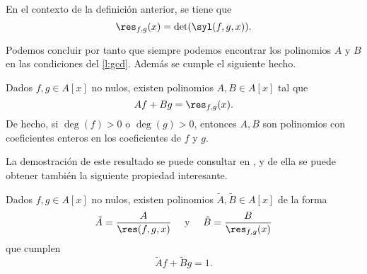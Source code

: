 \begin{proposicion}
    En el contexto de la definición anterior, se tiene que 
    \begin{equation*}
        \res_{f,g}(x) = \det(\syl(f,g,x)).
    \end{equation*}
\end{proposicion}
Podemos concluir por tanto que siempre podemos encontrar los polinomios $A$ y $B$ en las condiciones del \autoref{l:gcd}. Además se cumple el siguiente hecho.
\begin{proposicion}
    Dados $f,g\in A[x]$ no nulos, existen polinomios $A,B\in A[x]$ tal que  
    $$Af+Bg = \res_{f,g}(x).$$
    De hecho, si $\deg(f)>0$ o $\deg(g)>0$, entonces $A,B$ son polinomios con coeficientes enteros en los coeficientes de $f$ y $g$.
\end{proposicion}
La demostración de este resultado se puede consultar en \cite{ideals_varieties}, y de ella se puede obtener también la siguiente propiedad interesante.
\begin{proposicion}
    Dados $f,g\in A[x]$ no nulos, existen polinomios $\tilde{A}, \tilde{B} \in A[x]$ de la forma
    \begin{equation*}
        \tilde{A} = \frac{A}{\res(f,g,x)}\quad \text{ y }\quad \tilde{B} = \frac{B}{\res_{f,g}(x)}
    \end{equation*}
    que cumplen
    \begin{equation*}
        \tilde{A}f + \tilde{B}g = 1.
    \end{equation*}
\end{proposicion}



